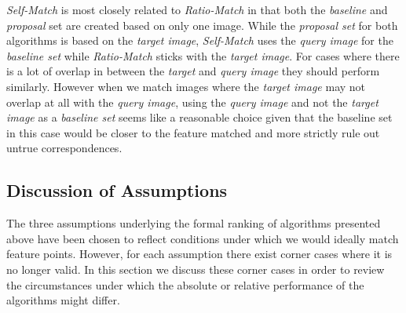 \documentclass[review]{elsarticle}
\begin{document}
\emph{Self-Match} is most closely related to \emph{Ratio-Match} in that both the \emph{baseline} and \emph{proposal} set are created based on only one image. While the \emph{proposal set} for both algorithms is based on the \emph{target image}, \emph{Self-Match} uses the \emph{query image} for the \emph{baseline set} while \emph{Ratio-Match} sticks with the \emph{target image}. For cases where there is a lot of overlap in between the \emph{target} and \emph{query image} they should perform similarly. However when we match images where the \emph{target image} may not overlap at all with the \emph{query image}, using the \emph{query image} and not the \emph{target image} as a \emph{baseline set} seems like a reasonable choice given that the baseline set in this case would be closer to the feature matched and more strictly rule out untrue correspondences.

\subsection{Discussion of Assumptions}
\label{ref:disc_assumptions}




The three assumptions underlying the formal ranking of algorithms presented above have been chosen to reflect conditions under which we would ideally match feature points. However, for each assumption there exist corner cases where it is no longer valid. In this section we discuss these corner cases in order to review the circumstances under which the absolute or relative performance of the algorithms might differ.
\end{document}
